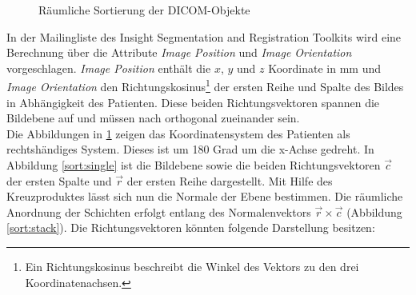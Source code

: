 \begin{figure}[htb]
\centering
{}
\caption{Räumliche Sortierung der DICOM-Objekte}
\label{sort}
\end{figure}

In der Mailingliste des Insight Segmentation and Registration Toolkits \cite{itk:mail} wird eine Berechnung über die Attribute \textit{Image Position} und \textit{Image Orientation} vorgeschlagen.
\textit{Image Position} enthält die $x$, $y$ und $z$ Koordinate in mm und \textit{Image Orientation} den Richtungskosinus\footnote{Ein Richtungskosinus beschreibt die Winkel des Vektors zu den drei Koordinatenachsen.} der ersten Reihe und Spalte des Bildes in Abhängigkeit des Patienten. Diese beiden Richtungsvektoren spannen die Bildebene auf und müssen nach \cite[C.7.6.2.1.1]{dicom:iod} orthogonal zueinander sein.\\
Die Abbildungen in \ref{sort} zeigen das Koordinatensystem des Patienten als rechtshändiges System\cite[S.419]{dicom:iod}. Dieses ist um 180 Grad um die x-Achse gedreht. In Abbildung \ref{sort:single} ist die Bildebene sowie die beiden Richtungsvektoren $\vec{c}$ der ersten Spalte und $\vec{r}$ der ersten Reihe dargestellt. Mit Hilfe des Kreuzproduktes lässt sich nun die Normale der Ebene bestimmen. Die räumliche Anordnung der Schichten erfolgt entlang des Normalenvektors $\vec{r} \times \vec{c}$ (Abbildung \ref{sort:stack}). Die Richtungsvektoren könnten folgende Darstellung besitzen:


